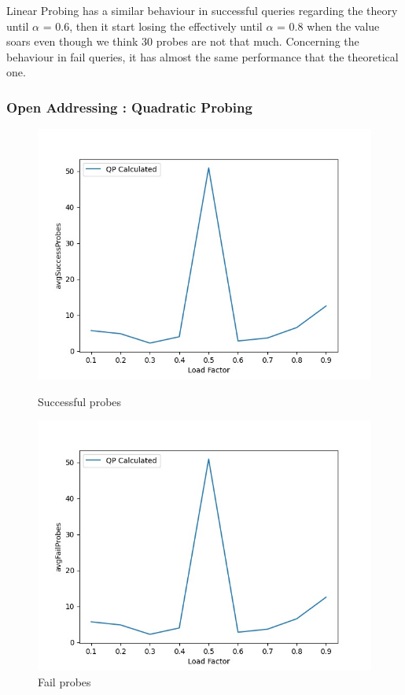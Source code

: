 \documentclass{article}
\begin{document}
    Linear Probing has a similar behaviour in successful queries regarding the theory until $\alpha$ = 0.6, then it start losing the effectively until $\alpha$ = 0.8 when the value soars even though we think 30 probes are not that much.
    Concerning the behaviour in fail queries, it has almost the same performance that the theoretical one.
    
\subsubsection*{Open Addressing : Quadratic Probing}

        \begin{figure}[!h]
          \includegraphics[width=\linewidth]{images/loadFactor_vs_avgSuccessProbes_QP.jpeg}
          \caption{Successful probes}\label{fig:plot6}
        \endminipage\hfill
          \includegraphics[width=\linewidth]{images/loadFactor_vs_avgFailProbes_QP.jpeg}
          \caption{Fail probes}\label{fig:plot7}
        \endminipage
    \end{figure}
    
\end{document}
